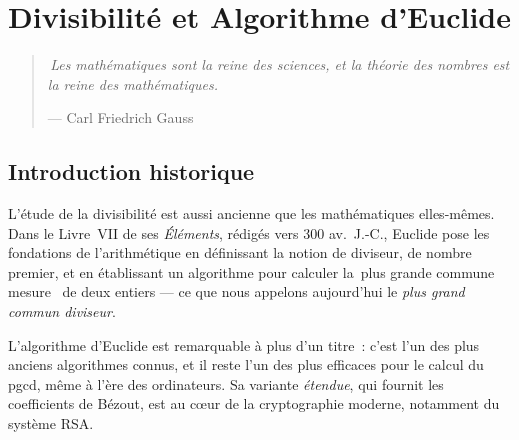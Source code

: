 \documentclass[12pt,a4paper,openany]{book}
\theoremstyle{definition}
\theoremstyle{plain}
\theoremstyle{remark}
\providecommand{\og}{\guillemotleft\,}
\providecommand{\fg}{\,\guillemotright}
\begin{document}
\newpage

\tableofcontents

\newpage


\chapter{Divisibilité et Algorithme d'Euclide}
\label{ch:divisibilite}


\begin{quote}
\itshape
\og Les mathématiques sont la reine des sciences, et la théorie des nombres est la
reine des mathématiques. \fg{}

\hfill --- Carl Friedrich Gauss
\end{quote}

\bigskip

\section{Introduction historique}
\label{sec:ch1:intro}


L'étude de la divisibilité est aussi ancienne que les mathématiques elles-mêmes. Dans
le Livre~VII de ses \textit{Éléments},
rédigés vers 300 av.~J.-C., Euclide pose les fondations de l'arithmétique en
définissant la notion de diviseur, de nombre premier, et en établissant un algorithme
pour calculer la \og plus grande commune mesure \fg{} de deux entiers --- ce que nous
appelons aujourd'hui le \emph{plus grand commun diviseur}.

L'algorithme d'Euclide est remarquable à plus d'un titre~:
c'est l'un des plus anciens algorithmes connus, et il reste l'un des plus efficaces
pour le calcul du pgcd, même à l'ère des ordinateurs. Sa variante
\emph{étendue}, qui fournit les coefficients de
Bézout, est au c\oe ur de la cryptographie
moderne, notamment du système RSA.
\end{document}
